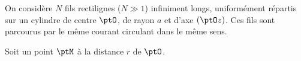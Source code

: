 \newpage








\hauteurLargeurCadreReponse		{8mm}{2cm}
\initialisationEntrainement

\debutEntrainement


                                \initialisationPartieGauche %
On considère $N$ fils rectilignes ($N\gg1$) infiniment longs, uniformément répartis
sur un cylindre de centre $\ptO$, de rayon $a$ et d'axe $(\ptO z)$. Ces fils
sont parcourus par le même courant circulant dans le même sens.

Soit un point $\ptM$ à la distance $r$ de $\ptO$.
%
                                \initialisationPartieDroite %

